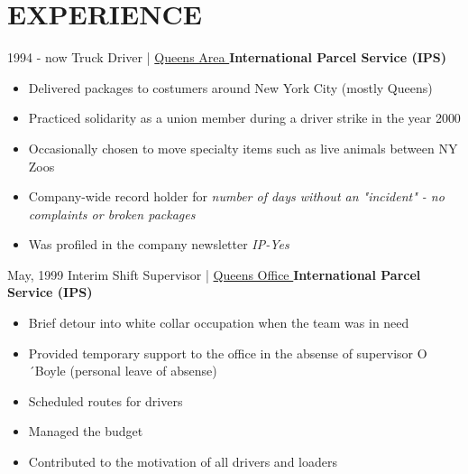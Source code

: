 \documentclass[]{friggeri-cv_reccius-experiment}
\begin{document}
\section{EXPERIENCE}
\begin{entrylist}

  \entry
    {1994 - now\enspace}
    {Truck Driver | }{ \href{https://kingofqueens.fandom.com/de/wiki/International_Parcel_Service}{\small Queens Area \faMousePointer}}
    {\normalsize\textbf{\color{ipsgreen}\faMapMarker\space International Parcel Service (IPS)}}
    {\jobspace
    \begin{itemize}[leftmargin=*, itemsep = 0.1em]
    \item Delivered packages to costumers around New York City (mostly Queens)
    \item Practiced solidarity as a union member during a driver strike in the year 2000
    \item Occasionally chosen to move specialty items such as live animals between NY Zoos
    \item Company-wide record holder for \textit{number of days without an "incident" - no complaints or broken packages}
    \item Was profiled in the company newsletter \textit{IP-Yes}\\
    \end{itemize}
    }
    
  \entry
    {May, 1999\enspace}
    {Interim Shift Supervisor | }{ \href{https://kingofqueens.fandom.com/de/wiki/International_Parcel_Service}{\small Queens Office \faMousePointer}}
    {\normalsize\textbf{\color{ipsgreen}\faMapMarker\space International Parcel Service (IPS)}}
    {\jobspace
    \begin{itemize}[leftmargin=*, itemsep = 0.1em]
    \item Brief detour into white collar occupation when the team was in need
    \item Provided temporary support to the office in the absense of supervisor O´Boyle (personal leave of absense)
    \item Scheduled routes for drivers
    \item Managed the budget
    \item Contributed to the motivation of all drivers and loaders\\
    \end{itemize}
    }
    

\end{entrylist}
\end{document}
